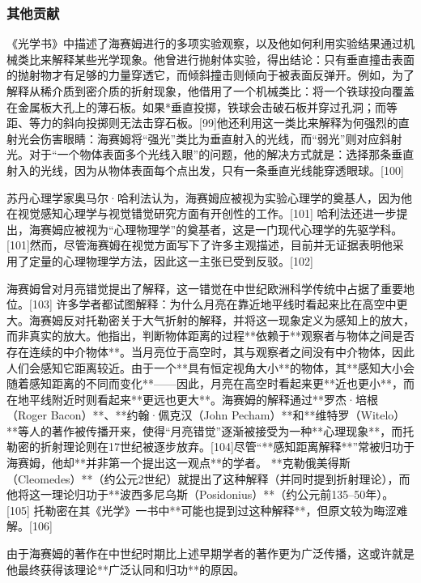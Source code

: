 \subsubsection{其他贡献}
《光学书》中描述了海赛姆进行的多项实验观察，以及他如何利用实验结果通过机械类比来解释某些光学现象。他曾进行抛射体实验，得出结论：只有垂直撞击表面的抛射物才有足够的力量穿透它，而倾斜撞击则倾向于被表面反弹开。例如，为了解释从稀介质到密介质的折射现象，他借用了一个机械类比：将一个铁球投向覆盖在金属板大孔上的薄石板。如果*垂直投掷，铁球会击破石板并穿过孔洞；而等距、等力的斜向投掷则无法击穿石板。[99]他还利用这一类比来解释为何强烈的直射光会伤害眼睛：海赛姆将“强光”类比为垂直射入的光线，而“弱光”则对应斜射光。对于“一个物体表面多个光线入眼”的问题，他的解决方式就是：选择那条垂直射入的光线，因为从物体表面每个点出发，只有一条垂直光线能穿透眼球。[100]

苏丹心理学家奥马尔·哈利法认为，海赛姆应被视为实验心理学的奠基人，因为他在视觉感知心理学与视觉错觉研究方面有开创性的工作。[101]
哈利法还进一步提出，海赛姆应被视为“心理物理学”的奠基者，这是一门现代心理学的先驱学科。[101]然而，尽管海赛姆在视觉方面写下了许多主观描述，目前并无证据表明他采用了定量的心理物理学方法，因此这一主张已受到反驳。[102]

海赛姆曾对月亮错觉提出了解释，这一错觉在中世纪欧洲科学传统中占据了重要地位。[103]
许多学者都试图解释：为什么月亮在靠近地平线时看起来比在高空中更大。海赛姆反对托勒密关于大气折射的解释，并将这一现象定义为感知上的放大，而非真实的放大。他指出，判断物体距离的过程**依赖于**观察者与物体之间是否存在连续的中介物体**。当月亮位于高空时，其与观察者之间没有中介物体，因此人们会感知它距离较近。由于一个**具有恒定视角大小**的物体，其**感知大小会随着感知距离的不同而变化**——因此，月亮在高空时看起来更**近也更小**，而在地平线附近时则看起来**更远也更大**。海赛姆的解释通过**罗杰·培根（Roger Bacon）**、**约翰·佩克汉（John Pecham）**和**维特罗（Witelo）**等人的著作被传播开来，使得“月亮错觉”逐渐被接受为一种**心理现象**，而托勒密的折射理论则在17世纪被逐步放弃。[104]尽管“**感知距离解释**”常被归功于海赛姆，他却**并非第一个提出这一观点**的学者。
**克勒俄美得斯（Cleomedes）**（约公元2世纪）就提出了这种解释（并同时提到折射理论），而他将这一理论归功于**波西多尼乌斯（Posidonius）**（约公元前135–50年）。[105]
托勒密在其《光学》一书中**可能也提到过这种解释**，但原文较为晦涩难解。[106]

由于海赛姆的著作在中世纪时期比上述早期学者的著作更为广泛传播，这或许就是他最终获得该理论**广泛认同和归功**的原因。
